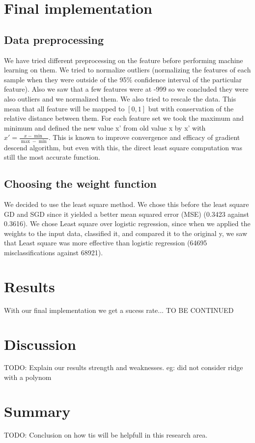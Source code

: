 \documentclass[10pt,conference,compsocconf]{IEEEtran}
\begin{document}
\section{Final implementation}
\subsection{Data preprocessing} We have tried different preprocessing on the feature before performing machine learning on them. We tried to normalize outliers (normalizing the features of each sample when they were outside of the 95\% confidence interval of the particular feature). Also we saw that a few features were at -999 so we concluded they were also outliers and we normalized them.
We also tried to rescale the data. This mean that all feature will be  mapped to \( [0,1] \) but with conservation of the relative distance between them. For each feature set we took the maximum and minimum and defined the new value x' from old value x by x' with $x' = \frac{x-\min}{\max - \min }$. This is known to improve convergence and efficacy of gradient descend algorithm, but even with this, the direct least square computation was still the most accurate function.
\subsection{Choosing the weight function} We decided to use the least square method. We chose this before the least square GD and SGD since it yielded a better mean squared error (MSE) (0.3423 against 0.3616). We chose Least square over logistic regression, since when we applied the weights to the input data, classified it, and compared it to the original y, we saw that Least square was more effective than logistic regression (64695 misclassifications against 68921).
\section{Results}
With our final implementation we get a sucess rate... TO BE CONTINUED

\section{Discussion}
TODO: Explain our results strength and weaknesses.
eg: did not consider ridge with a polynom

\section{Summary}
TODO: Conclusion on how tis will be helpfull in this research area.



\end{document}
